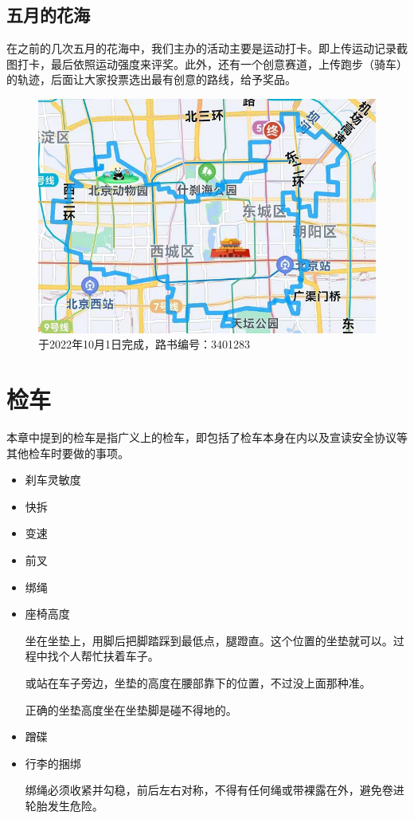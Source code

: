 \documentclass{ctexbook}
\begin{document}
\subsection{五月的花海}
在之前的几次五月的花海中，我们主办的活动主要是运动打卡。即上传运动记录截图打卡，最后依照运动强度来评奖。此外，还有一个创意赛道，上传跑步（骑车）的轨迹，后面让大家投票选出最有创意的路线，给予奖品。

\begin{figure}[H]
    \centering
    \includegraphics[width=0.7\linewidth]{fig/地图路线.png}
    \caption{于2022年10月1日完成，路书编号：3401283}
    \label{fig:百团大战}
\end{figure}

\section{检车}
\label{sec:检车}
本章中提到的检车是指广义上的检车，即包括了检车本身在内以及宣读安全协议等其他检车时要做的事项。
\begin{itemize}

\item 刹车灵敏度

\item 快拆

\item 变速

\item 前叉

\item 绑绳

\item 座椅高度

坐在坐垫上，用脚后把脚踏踩到最低点，腿蹬直。这个位置的坐垫就可以。过程中找个人帮忙扶着车子。

或站在车子旁边，坐垫的高度在腰部靠下的位置，不过没上面那种准。

正确的坐垫高度坐在坐垫脚是碰不得地的。

\item 蹭碟

\item 行李的捆绑

绑绳必须收紧并勾稳，前后左右对称，不得有任何绳或带裸露在外，避免卷进轮胎发生危险。
\end{itemize}
\end{document}
